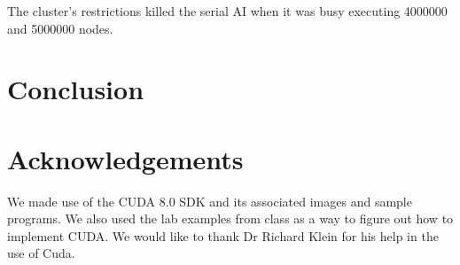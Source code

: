 \documentclass[a4paper]{report}
\begin{document}
The cluster’s restrictions killed the serial AI when it was busy executing 4000000 and 5000000 nodes.


\section{Conclusion}

\section*{Acknowledgements}
We made use of the CUDA 8.0 SDK and its associated images and sample programs. We also used the lab examples from class as a way to figure out how to implement CUDA. We would like to thank Dr Richard Klein for his help in the use of Cuda.


{}
\end{document}
